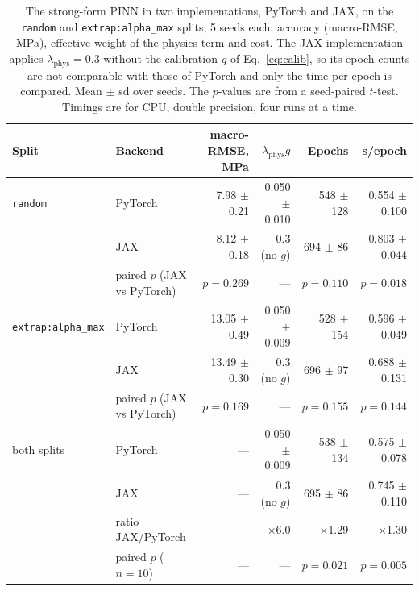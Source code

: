 \begin{table}[t]
\centering
\caption[The strong-form PINN in PyTorch and in JAX]{The strong-form PINN in two implementations, PyTorch and JAX, on the \texttt{random} and \texttt{extrap:alpha\_max} splits, 5 seeds each: accuracy (macro-RMSE, MPa), effective weight of the physics term and cost. The JAX implementation applies $\lambda_{\mathrm{phys}}=0.3$ without the calibration $g$ of Eq.~\eqref{eq:calib}, so its epoch counts are not comparable with those of PyTorch and only the time per epoch is compared. Mean $\pm$ sd over seeds. The $p$-values are from a seed-paired $t$-test. Timings are for CPU, double precision, four runs at a time.}
\label{tab:backend}
\small
\begin{tabular}{@{}llrrrr@{}}
\toprule
Split & Backend & macro-RMSE, MPa & $\lambda_{\mathrm{phys}}g$ & Epochs & s/epoch \\
\midrule
\texttt{random} & PyTorch & 7.98 $\pm$ 0.21 & 0.050 $\pm$ 0.010 & 548 $\pm$ 128 & 0.554 $\pm$ 0.100 \\
 & JAX & 8.12 $\pm$ 0.18 & 0.3 (no $g$) & 694 $\pm$ 86 & 0.803 $\pm$ 0.044 \\
 & paired $p$ (JAX vs PyTorch) & $p = 0.269$ & --- & $p = 0.110$ & $p = 0.018$ \\
\addlinespace
\texttt{extrap:alpha\_max} & PyTorch & 13.05 $\pm$ 0.49 & 0.050 $\pm$ 0.009 & 528 $\pm$ 154 & 0.596 $\pm$ 0.049 \\
 & JAX & 13.49 $\pm$ 0.30 & 0.3 (no $g$) & 696 $\pm$ 97 & 0.688 $\pm$ 0.131 \\
 & paired $p$ (JAX vs PyTorch) & $p = 0.169$ & --- & $p = 0.155$ & $p = 0.144$ \\
\midrule
both splits & PyTorch & --- & 0.050 $\pm$ 0.009 & 538 $\pm$ 134 & 0.575 $\pm$ 0.078 \\
 & JAX & --- & 0.3 (no $g$) & 695 $\pm$ 86 & 0.745 $\pm$ 0.110 \\
 & ratio JAX/PyTorch & --- & $\times$6.0 & $\times$1.29 & $\times$1.30 \\
 & paired $p$ ($n = 10$) & --- & --- & $p = 0.021$ & $p = 0.005$ \\
\bottomrule
\end{tabular}
\end{table}

